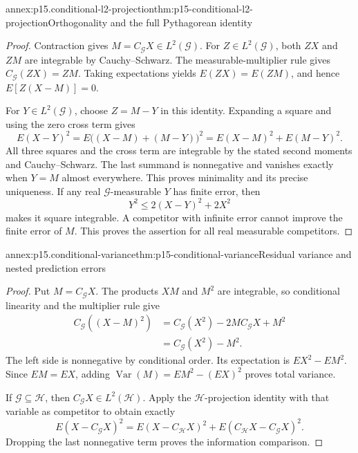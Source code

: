 \begin{annexitem}{annex:p15.conditional-l2-projection}{thm:p15-conditional-l2-projection}{Orthogonality and the full Pythagorean identity}
\begin{proof}
Contraction gives \(M=C_{\mathcal G}X\in L^2(\mathcal G)\).
For \(Z\in L^2(\mathcal G)\), both \(ZX\) and \(ZM\) are
integrable by Cauchy--Schwarz.
The measurable-multiplier rule gives \(C_{\mathcal G}(ZX)=ZM\).
Taking expectations yields \(E(ZX)=E(ZM)\), and hence
\(E[Z(X-M)]=0\).

For \(Y\in L^2(\mathcal G)\), choose \(Z=M-Y\) in this identity.
Expanding a square and using the zero cross term gives
\[
 E(X-Y)^2
   =E\bigl((X-M)+(M-Y)\bigr)^2
   =E(X-M)^2+E(M-Y)^2 .
\]
All three squares and the cross term are integrable by the stated
second moments and Cauchy--Schwarz.
The last summand is nonnegative and vanishes exactly when \(Y=M\)
almost everywhere. This proves minimality and its precise uniqueness.
If any real \(\mathcal G\)-measurable \(Y\) has finite error, then
\[
                          Y^2\leq2(X-Y)^2+2X^2
\]
makes it square integrable. A competitor with infinite error cannot
improve the finite error of \(M\). This proves the assertion for
all real measurable competitors.
\end{proof}
\end{annexitem}

\begin{annexitem}{annex:p15.conditional-variance}{thm:p15-conditional-variance}{Residual variance and nested prediction errors}
\begin{proof}
Put \(M=C_{\mathcal G}X\).
The products \(XM\) and \(M^2\) are integrable, so conditional
linearity and the multiplier rule give
\[
 \begin{aligned}
 C_{\mathcal G}((X-M)^2)
   &=C_{\mathcal G}(X^2)-2M C_{\mathcal G}X+M^2\\
   &=C_{\mathcal G}(X^2)-M^2 .
 \end{aligned}
\]
The left side is nonnegative by conditional order. Its expectation
is \(EX^2-EM^2\).
Since \(EM=EX\), adding \(\operatorname{Var}(M)=EM^2-(EX)^2\)
proves total variance.

If \(\mathcal G\subseteq\mathcal H\), then
\(C_{\mathcal G}X\in L^2(\mathcal H)\).
Apply the \(\mathcal H\)-projection identity with that variable
as competitor to obtain exactly
\[
 E(X-C_{\mathcal G}X)^2
    =E(X-C_{\mathcal H}X)^2
             +E(C_{\mathcal H}X-C_{\mathcal G}X)^2 .
\]
Dropping the last nonnegative term proves the information comparison.
\end{proof}
\end{annexitem}

